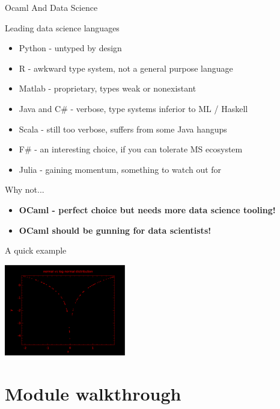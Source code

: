 \documentclass{beamer}
\begin{document}
\begin{frame}{Ocaml And Data Science}
\begin{block}{Leading data science languages}
\begin{itemize}
\item Python - untyped by design
\item R - awkward type system, not a general purpose language
\item Matlab - proprietary, types weak or nonexistant
\item Java and C\# - verbose, type systems inferior to ML / Haskell
\item Scala - still too verbose, suffers from some Java hangups
\item F\# - an interesting choice, if you can tolerate MS ecosystem
\item Julia - gaining momentum, something to watch out for
\end{itemize}
\end{block}
\pause

\begin{block}{Why not...}
\begin{itemize}
\item \textbf{OCaml - perfect choice but needs more data science tooling!}
\pause
\item \textbf {OCaml should be gunning for data scientists!}
\end{itemize}
\end{block}
\end{frame}

\begin{frame}{A quick example}

\pause
\begin{center}
 \includegraphics[width=200px,height=150px,bb=14 14 915 690]{./norm-vs-log.eps}
\end{center}
\end{frame}

  \section{Module walkthrough}
\end{document}
